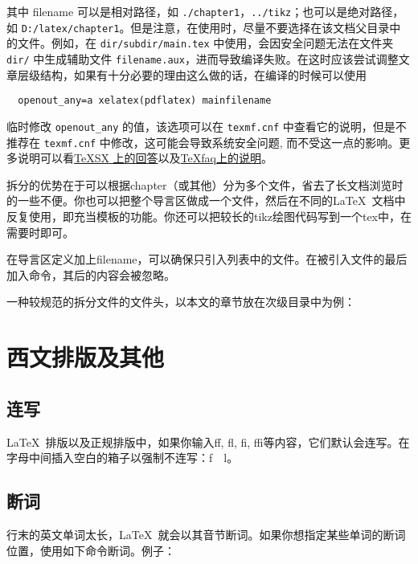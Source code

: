 其中 filename 可以是相对路径，如 \verb|./chapter1|，\verb|../tikz|；也可以是绝对路径，如 \verb|D:/latex/chapter1|。但是注意，在使用时，尽量不要选择在该文档父目录中的文件。例如，在 \verb|dir/subdir/main.tex| 中使用，会因安全问题无法在文件夹 \verb|dir/| 中生成辅助文件 \verb|filename.aux|，进而导致编译失败。在这时应该尝试调整文章层级结构，如果有十分必要的理由这么做的话，在编译的时候可以使用
\begin{verbatim}
  openout_any=a xelatex(pdflatex) mainfilename
\end{verbatim}
临时修改 \verb|openout_any| 的值，该选项可以在 \verb|texmf.cnf| 中查看它的说明，但是不推荐在 \verb|texmf.cnf| 中修改，这可能会导致系统安全问题, 而不受这一点的影响。更多说明可以看\href{https://tex.stackexchange.com/questions/2209/how-can-i-include-the-file-somedir-file-tex-in-the-file-somedir-subdir-another}{\TeX SX 上的回答}以及\href{http://www.texfaq.org/FAQ-includeother}{\TeX faq上的说明}。

拆分的优势在于可以根据chapter（或其他）分为多个文件，省去了长文档浏览时的一些不便。你也可以把整个导言区做成一个文件，然后在不同的\LaTeX\ 文档中反复使用，即充当模板的功能。你还可以把较长的tikz绘图代码写到一个tex中，在需要时即可。

在导言区定义加上filename，可以确保只引入列表中的文件。在被引入文件的最后加入命令，其后的内容会被忽略。

一种较规范的拆分文件的文件头，以本文的章节放在次级目录中为例：
\begin{latex}
\end{latex}

\section{西文排版及其他}
\subsection{连写}
\LaTeX\ 排版以及正规排版中，如果你输入ff, fl, fi, ffi等内容，它们默认会连写。在字母中间插入空白的箱子以强制不连写：f~~l。

\subsection{断词}
行末的英文单词太长，\LaTeX\ 就会以其音节断词。如果你想指定某些单词的断词位置，使用如下命令断词。例子：
\begin{latex}
\end{latex}

